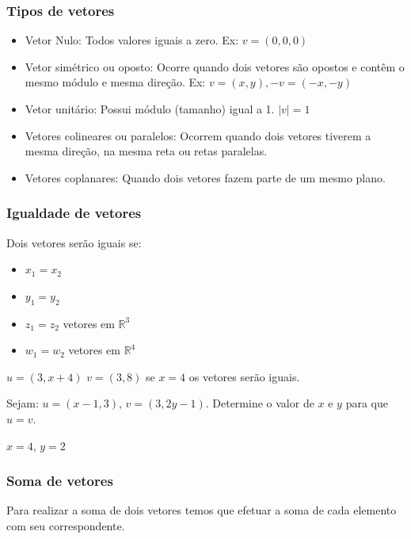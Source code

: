 \documentclass[12pt]{article}
\begin{document}
\subsubsection{Tipos de vetores}

\singlespacing
\begin{itemize}
	\item Vetor Nulo: Todos valores iguais a zero. Ex: \(v = (0,0,0)\)
	\item Vetor simétrico ou oposto: Ocorre quando dois vetores são opostos e contêm o mesmo módulo e mesma direção. Ex: \(v = (x,y), -v = (-x,-y)\)
	\item Vetor unitário: Possui módulo (tamanho) igual a 1. \(|v| = 1\)
	\item Vetores colineares ou paralelos: Ocorrem quando dois vetores tiverem a mesma direção, na mesma reta ou retas paralelas.
	\item Vetores coplanares: Quando dois vetores fazem parte de um mesmo plano.
\end{itemize}
\onehalfspacing
\pagebreak

\subsubsection{Igualdade de vetores}

Dois vetores serão iguais se: 

\singlespacing
\begin{itemize}
	\item \(x_{1} = x_{2}\)
	\item \(y_{1} = y_{2}\)
	\item \(z_{1} = z_{2}\) vetores em \(\mathbb{R}^3\)
	\item \(w_{1} = w_{2}\) vetores em \(\mathbb{R}^4\)
\end{itemize}
\onehalfspacing

\(u = (3, x + 4)\) \(v = (3, 8)\) se \(x = 4\) os vetores serão iguais.

Sejam: \(u = (x-1, 3)\), \(v = (3, 2y-1)\). Determine o valor de \(x\) e \(y\) para que \(u = v\).

\(x = 4\), \(y = 2\)

\subsubsection{Soma de vetores}

Para realizar a soma de dois vetores temos que efetuar a soma de cada elemento com seu correspondente.
\end{document}
